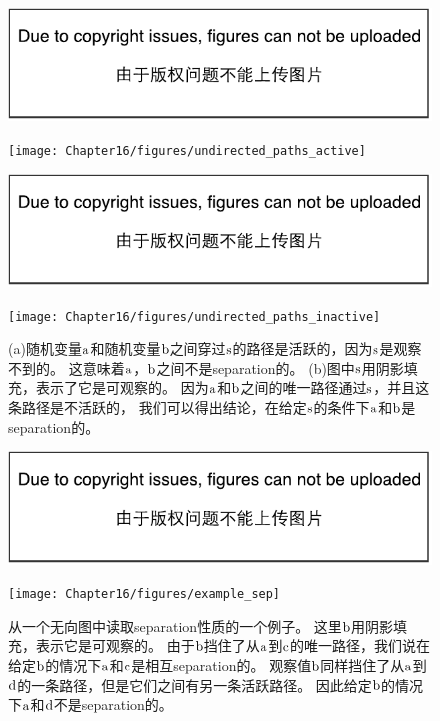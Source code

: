 \begin{figure}[!htb]
\ifOpenSource
\centerline{\includegraphics{figure.pdf}}
\else
	\centerline{\texttt{[image: Chapter16/figures/undirected\_paths\_active]}}
\fi
\ifOpenSource
\centerline{\includegraphics{figure.pdf}}
\else
	\centerline{\texttt{[image: Chapter16/figures/undirected\_paths\_inactive]}}	
\fi
\caption{(a)随机变量$\mathrm{a}$和随机变量$\mathrm{b}$之间穿过$\mathrm{s}$的路径是活跃的，因为$\mathrm{s}$是观察不到的。
这意味着$\mathrm{a}$，$\mathrm{b}$之间不是\gls{separation}的。
 (b)图中$\mathrm{s}$用阴影填充，表示了它是可观察的。
因为$\mathrm{a}$和$\mathrm{b}$之间的唯一路径通过$\mathrm{s}$，并且这条路径是不活跃的，
我们可以得出结论，在给定$\mathrm{s}$的条件下$\mathrm{a}$和$\mathrm{b}$是\gls{separation}的。}
\label{fig:undirected_paths_active}
\end{figure}

\begin{figure}[!htb]
\ifOpenSource
\centerline{\includegraphics{figure.pdf}}
\else
	\centerline{\texttt{[image: Chapter16/figures/example\_sep]}}
\fi
\caption{从一个无向图中读取\gls{separation}性质的一个例子。
这里$\mathrm{b}$用阴影填充，表示它是可观察的。
由于$\mathrm{b}$挡住了从$\mathrm{a}$到$\mathrm{c}$的唯一路径，我们说在给定$\mathrm{b}$的情况下$\mathrm{a}$和$\mathrm{c}$是相互\gls{separation}的。
观察值$\mathrm{b}$同样挡住了从$\mathrm{a}$到$\mathrm{d}$的一条路径，但是它们之间有另一条活跃路径。
因此给定$\mathrm{b}$的情况下$\mathrm{a}$和$\mathrm{d}$不是\gls{separation}的。}
	\label{fig:example_sep}
\end{figure}



